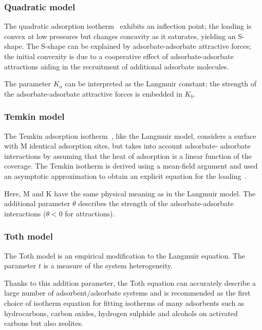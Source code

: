 \subsubsection{Quadratic model}

The quadratic adsorption isotherm~\cite{hillIntroductionStatisticalThermodynamics1986} 
exhibits an inflection point; the loading
is convex at low pressures but changes concavity as it saturates, yielding
an S-shape. The S-shape can be explained by adsorbate-adsorbate attractive
forces; the initial convexity is due to a cooperative
effect of adsorbate-adsorbate attractions aiding in the recruitment of
additional adsorbate molecules.

The parameter \(K_a\) can be interpreted as the Langmuir constant; the
strength of the adsorbate-adsorbate attractive forces is embedded in \(K_b\).

\subsubsection{Temkin model}

The Temkin adsorption isotherm~\cite{temkinKineticsAmmoniaSynthesis1940}, 
like the Langmuir model, considers
a surface with M identical adsorption sites, but takes into account adsorbate-
adsorbate interactions by assuming that the heat of adsorption is a linear
function of the coverage. The Temkin isotherm is derived using a
mean-field argument and used an asymptotic approximation
to obtain an explicit equation for the 
loading~\cite{simonOptimizingNanoporousMaterials2014}.

Here, M and K have the same physical meaning as in the Langmuir model.
The additional parameter \(\theta\) describes the strength of the adsorbate-adsorbate
interactions (\(\theta < 0\) for attractions).

\subsubsection{Toth model}

The Toth model is an empirical modification to the Langmuir equation.
The parameter \(t\) is a measure of the system heterogeneity.

Thanks to this addition parameter, the Toth equation can accurately describe a
large number of adsorbent/adsorbate systems and is recommended as the first
choice of isotherm equation for fitting isotherms of many adsorbents such as
hydrocarbons, carbon oxides, hydrogen sulphide and alcohols on activated carbons
but also zeolites.


